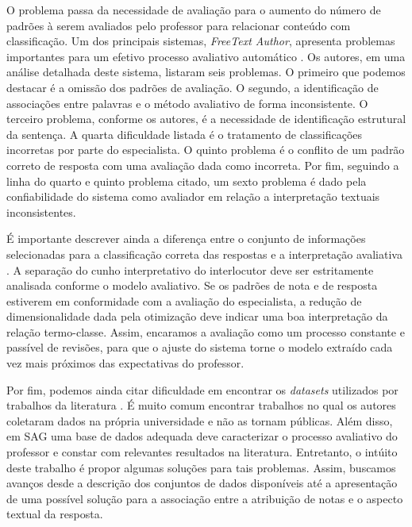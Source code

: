 O problema passa da necessidade de avaliação para o aumento do número de padrões à serem avaliados pelo professor para relacionar conteúdo com classificação. Um dos principais sistemas, \textit{FreeText Author}, apresenta problemas importantes para um efetivo processo avaliativo automático \cite{butcher2010}. Os autores, em uma análise detalhada deste sistema, listaram seis problemas. O primeiro que podemos destacar é a omissão dos padrões de avaliação. O segundo, a identificação de associações entre palavras e o método avaliativo de forma inconsistente. O terceiro problema, conforme os autores, é a necessidade de identificação estrutural da sentença. A quarta dificuldade listada é o tratamento de classificações incorretas por parte do especialista. O quinto problema é o conflito de um padrão correto de resposta com uma avaliação dada como incorreta. Por fim, seguindo a linha do quarto e quinto problema citado, um sexto problema é dado pela confiabilidade do sistema como avaliador em relação a interpretação textuais inconsistentes.


É importante descrever ainda a diferença entre o conjunto de informações selecionadas para a classificação correta das respostas e a interpretação avaliativa \cite{ramachandran2015a}. A separação do cunho interpretativo do interlocutor deve ser estritamente analisada conforme o modelo avaliativo. Se os padrões de nota e de resposta estiverem em conformidade com a avaliação do especialista, a redução de dimensionalidade dada pela otimização deve indicar uma boa interpretação da relação termo-classe. Assim, encaramos a avaliação como um processo constante e passível de revisões, para que o ajuste do sistema torne o modelo extraído cada vez mais próximos das expectativas do professor. 

Por fim, podemos ainda citar dificuldade em encontrar os \textit{datasets} utilizados por trabalhos da literatura \cite{burrows2015}. É muito comum encontrar trabalhos no qual os autores coletaram dados na própria universidade e não as tornam públicas. Além disso, em SAG uma base de dados adequada deve caracterizar o processo avaliativo do professor e constar com relevantes resultados na literatura. Entretanto, o intúito deste trabalho é propor algumas soluções para tais problemas. Assim, buscamos avanços desde a descrição dos conjuntos de dados disponíveis até a apresentação de uma possível solução para a associação entre a atribuição de notas e o aspecto textual da resposta.

